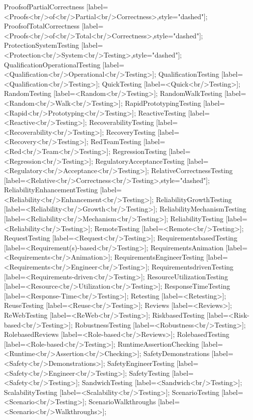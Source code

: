 \documentclass{article}
\begin{document}
{ProofsofPartialCorrectness [label=<Proofs<br/>of<br/>Partial<br/>Correctness>,style="dashed"];
ProofsofTotalCorrectness [label=<Proofs<br/>of<br/>Total<br/>Correctness>,style="dashed"];
ProtectionSystemTesting [label=<Protection<br/>System<br/>Testing>,style="dashed"];
QualificationOperationalTesting [label=<Qualification<br/>Operational<br/>Testing>];
QualificationTesting [label=<Qualification<br/>Testing>];
QuickTesting [label=<Quick<br/>Testing>];
RandomTesting [label=<Random<br/>Testing>];
RandomWalkTesting [label=<Random<br/>Walk<br/>Testing>];
RapidPrototypingTesting [label=<Rapid<br/>Prototyping<br/>Testing>];
ReactiveTesting [label=<Reactive<br/>Testing>];
RecoverabilityTesting [label=<Recoverability<br/>Testing>];
RecoveryTesting [label=<Recovery<br/>Testing>];
RedTeamTesting [label=<Red<br/>Team<br/>Testing>];
RegressionTesting [label=<Regression<br/>Testing>];
RegulatoryAcceptanceTesting [label=<Regulatory<br/>Acceptance<br/>Testing>];
RelativeCorrectnessTesting [label=<Relative<br/>Correctness<br/>Testing>,style="dashed"];
ReliabilityEnhancementTesting [label=<Reliability<br/>Enhancement<br/>Testing>];
ReliabilityGrowthTesting [label=<Reliability<br/>Growth<br/>Testing>];
ReliabilityMechanismTesting [label=<Reliability<br/>Mechanism<br/>Testing>];
ReliabilityTesting [label=<Reliability<br/>Testing>];
RemoteTesting [label=<Remote<br/>Testing>];
RequestTesting [label=<Request<br/>Testing>];
RequirementsbasedTesting [label=<Requirement(s)-based<br/>Testing>];
RequirementsAnimation [label=<Requirements<br/>Animation>];
RequirementsEngineerTesting [label=<Requirements<br/>Engineer<br/>Testing>];
RequirementsdrivenTesting [label=<Requirements-driven<br/>Testing>];
ResourceUtilizationTesting [label=<Resource<br/>Utilization<br/>Testing>];
ResponseTimeTesting [label=<Response-Time<br/>Testing>];
Retesting [label=<Retesting>];
ReuseTesting [label=<Reuse<br/>Testing>];
Reviews [label=<Reviews>];
ReWebTesting [label=<ReWeb<br/>Testing>];
RiskbasedTesting [label=<Risk-based<br/>Testing>];
RobustnessTesting [label=<Robustness<br/>Testing>];
RolebasedReviews [label=<Role-based<br/>Reviews>];
RolebasedTesting [label=<Role-based<br/>Testing>];
RuntimeAssertionChecking [label=<Runtime<br/>Assertion<br/>Checking>];
SafetyDemonstrations [label=<Safety<br/>Demonstrations>];
SafetyEngineerTesting [label=<Safety<br/>Engineer<br/>Testing>];
SafetyTesting [label=<Safety<br/>Testing>];
SandwichTesting [label=<Sandwich<br/>Testing>];
ScalabilityTesting [label=<Scalability<br/>Testing>];
ScenarioTesting [label=<Scenario<br/>Testing>];
ScenarioWalkthroughs [label=<Scenario<br/>Walkthroughs>];
}
\end{document}
